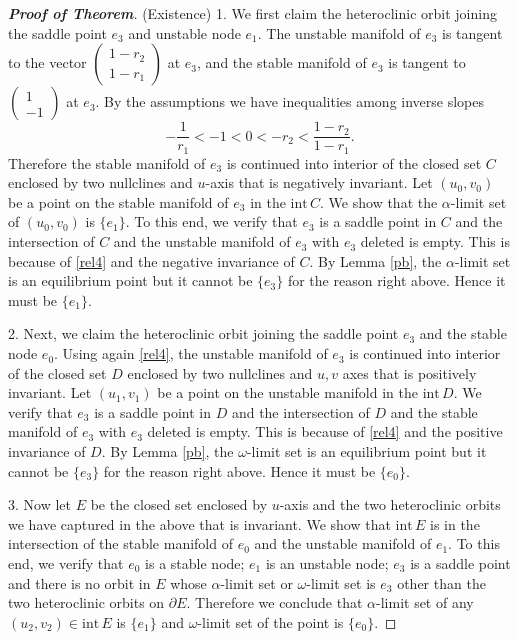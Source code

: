 \documentclass{amsart}
\theoremstyle{definition}
\numberwithin{equation}{section}
\def\ii{{\textrm{int}}\,}
\begin{document}
\begin{proof}[\textbf{Proof of Theorem}]
\bigskip
(Existence) 1. We first claim the heteroclinic orbit joining the saddle point $e_3$ and unstable node $e_1$. The unstable manifold of $e_3$ is tangent to the vector $\begin{pmatrix} 1-r_2 \\ 1-r_1 \end{pmatrix}$ at $e_3$, and the stable manifold of $e_3$ is tangent to $\begin{pmatrix} 1 \\ -1 \end{pmatrix}$ at $e_3$. By the assumptions we have inequalities among inverse slopes
\begin{equation}\label{rel4} -\frac{1}{r_1} < -1 < 0< -r_2 < \frac{1-r_2}{1-r_1}. \end{equation}
Therefore the stable manifold of $e_3$ is continued into interior of 
the closed set $C$ enclosed by two nullclines and $u$-axis that is negatively invariant. Let $(u_0,v_0)$ be a point on the stable manifold of $e_3$ in the $\ii C$. We show that the $\alpha$-limit set of $(u_0,v_0)$ is $\{e_1\}$. To this end, we verify that $e_3$ is a saddle point in $C$ and the intersection of $C$ and the unstable manifold of $e_3$ with $e_3$ deleted is empty. This is because of \eqref{rel4} and the negative invariance of $C$. By Lemma \ref{pb}, the $\alpha$-limit set is an equilibrium point but it cannot be $\{e_3\}$ for the reason right above. Hence it must be $\{e_1\}$.

2. Next, we claim the heteroclinic orbit joining the saddle point $e_3$ and the stable node $e_0$. Using again \eqref{rel4}, the unstable manifold of $e_3$ is continued into interior of the closed set $D$ enclosed by two nullclines and $u,v$ axes that is positively invariant. Let $(u_1,v_1)$ be a point on the unstable manifold in the $\ii D$. We verify that $e_3$ is a saddle point in $D$ and the intersection of $D$ and the stable manifold of $e_3$ with $e_3$ deleted is empty. This is because of \eqref{rel4} and the positive invariance of $D$. By Lemma \ref{pb}, the $\omega$-limit set is an equilibrium point but it cannot be $\{e_3\}$ for the reason right above. Hence it must be $\{e_0\}$.


3. Now let $E$ be the closed set enclosed by $u$-axis and the two heteroclinic orbits we have captured in the above that is invariant. We show that $\ii E$ is in the intersection of the stable manifold of $e_0$ and the unstable manifold of $e_1$. To this end, we verify that $e_0$ is a stable node; $e_1$ is an unstable node; $e_3$ is a saddle point and there is no orbit in $E$ whose $\alpha$-limit set or $\omega$-limit set is $e_3$ other than the two heteroclinic orbits on $\partial E$. Therefore we conclude that $\alpha$-limit set of any $(u_2,v_2) \in\ii E$ is $\{e_1\}$ and $\omega$-limit set of the point is $\{e_0\}$.


\end{proof}
\end{document}
